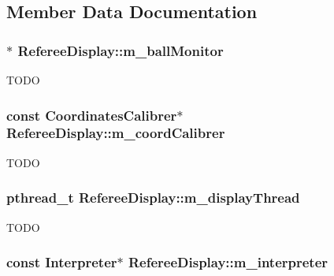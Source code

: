 \subsection{Member Data Documentation}
\hypertarget{classRefereeDisplay_ab3a1d764a476c413ed1f19be2c9a1215}{
\subsubsection[{m\_\-ballMonitor}]{$\ast$ {\bf RefereeDisplay::m\_\-ballMonitor}}}
\label{classRefereeDisplay_ab3a1d764a476c413ed1f19be2c9a1215}
TODO \hypertarget{classRefereeDisplay_a7be832637684b08b915a2ff3c6c0d9f2}{
\subsubsection[{m\_\-coordCalibrer}]{\setlength{\rightskip}{0pt plus 5cm}const {\bf CoordinatesCalibrer}$\ast$ {\bf RefereeDisplay::m\_\-coordCalibrer}}}
\label{classRefereeDisplay_a7be832637684b08b915a2ff3c6c0d9f2}
TODO \hypertarget{classRefereeDisplay_aded3908927ad3726777ece4d52cf3ca2}{
\subsubsection[{m\_\-displayThread}]{\setlength{\rightskip}{0pt plus 5cm}pthread\_\-t {\bf RefereeDisplay::m\_\-displayThread}}}
\label{classRefereeDisplay_aded3908927ad3726777ece4d52cf3ca2}
TODO \hypertarget{classRefereeDisplay_a510383c894f917032aadc71f1f31074f}{
\subsubsection[{m\_\-interpreter}]{\setlength{\rightskip}{0pt plus 5cm}const {\bf Interpreter}$\ast$ {\bf RefereeDisplay::m\_\-interpreter}}}
